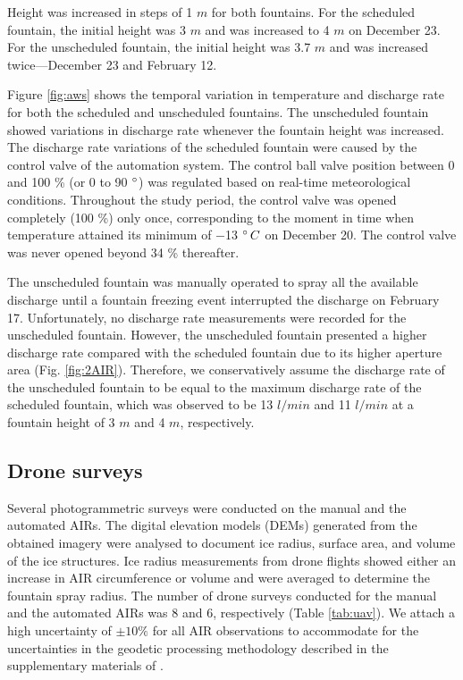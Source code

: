 \documentclass[tc, manuscript]{copernicus}
\begin{document}
Height was increased in steps of 1 $m$ for both fountains. For the scheduled fountain, the
initial height was 3 $m$ and was increased to 4 $m$ on December 23. For the unscheduled
fountain, the initial height was 3.7 $m$ and was increased twice---December
23 and February 12.

Figure \ref{fig:aws} shows the temporal variation in temperature and discharge rate for both the scheduled and
unscheduled fountains. The unscheduled fountain showed variations in discharge rate whenever the fountain height
was increased. The discharge rate variations of the scheduled fountain were caused by the control valve of the
automation system. The control ball valve position between 0 and 100 \% (or 0 to 90 $^{\circ}$) was regulated
based on real-time meteorological conditions. Throughout the study period, the control valve was opened
completely (100 \%) only once, corresponding to the moment in time when temperature attained its minimum of $-$13
$^{\circ} \, C$ on December 20. The control valve was never opened beyond 34 \% thereafter.  

The unscheduled fountain was manually operated to spray all the available discharge until a fountain freezing
event interrupted the discharge on February 17. Unfortunately, no discharge rate measurements were recorded
for the unscheduled fountain. However, the unscheduled fountain presented a higher discharge rate
compared with the scheduled fountain due to its higher aperture area (Fig. \ref{fig:2AIR}). Therefore, we
conservatively assume the discharge rate of the unscheduled fountain to be equal to the maximum discharge rate
of the scheduled fountain, which was observed to be 13 $l/min$ and 11 $l/min$ at a fountain height of 3 $m$ and 4
$m$, respectively.

\subsection{Drone surveys}

Several photogrammetric surveys were conducted on the manual and the automated AIRs. The digital elevation
models (DEMs) generated from the obtained imagery were analysed to document ice radius, surface area, and
volume of the ice structures. Ice radius measurements from drone flights showed either an increase in
AIR circumference or volume and were averaged to determine the fountain spray radius. The number of drone surveys
conducted for the manual and the automated AIRs was 8 and 6, respectively (Table \ref{tab:uav}). We
attach a high uncertainty of $\pm 10 \%$ for all AIR observations to accommodate for the uncertainties in
the geodetic processing methodology described in the supplementary materials of \citet{balasubramanianInfluenceMeteorologicalConditions2022}.
\end{document}
